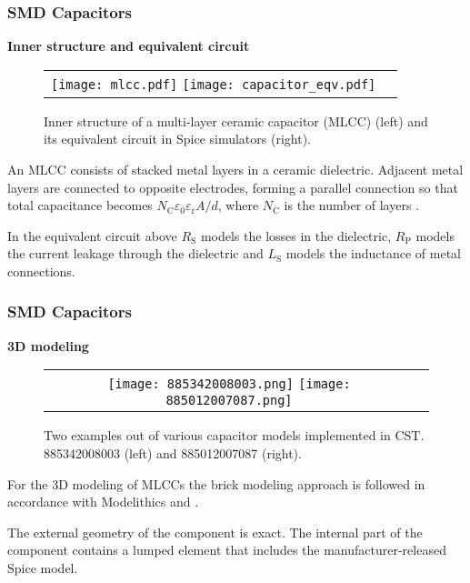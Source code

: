\begin{frame}
	\frametitle{SMD Capacitors} \textbf{Inner structure and equivalent circuit}
	\begin{figure}
		\centering
		\begin{tabular}{cc}
			\texttt{[image: mlcc.pdf]}
			\hspace{25pt}
			\texttt{[image: capacitor\_eqv.pdf]}
		\end{tabular}
		\caption{Inner structure of a multi-layer ceramic capacitor (MLCC) (left) and its equivalent circuit in Spice simulators (right).}
	\end{figure}
	\vspace{-15pt}
	An MLCC consists of stacked metal layers in a ceramic dielectric. Adjacent metal layers are connected to opposite electrodes, forming a parallel connection so that total capacitance becomes $N_{\mathrm{C}}\varepsilon_0\varepsilon_\mathrm{r}A/d$, where $N_{\mathrm{C}}$ is the number of layers \cite{5482787}.

	In the equivalent circuit above $R_\mathrm{S}$ models the losses in the dielectric, $R_\mathrm{P}$ models the current leakage through the dielectric and $L_\mathrm{S}$ models the inductance of metal connections.
\end{frame}

\begin{frame}
	\frametitle{SMD Capacitors} \textbf{3D modeling}
	\begin{figure}
		\centering
		\begin{tabular}{cc}
			\texttt{[image: 885342008003.png]}
			\hspace{25pt}
			\texttt{[image: 885012007087.png]}
		\end{tabular}
		\caption{Two examples out of various capacitor models implemented in CST. 885342008003 (left) and 885012007087 (right).}
	\end{figure}
	\vspace{0pt}
	For the 3D modeling of MLCCs the brick modeling approach is followed in accordance with Modelithics and \cite{8094717}.
	
	The external geometry of the component is exact. The internal part of the component contains a lumped element that includes the manufacturer-released Spice model.
\end{frame}

